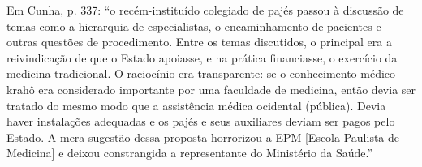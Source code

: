 Em Cunha, p. 337: \enquote{o recém-instituído colegiado de pajés passou à discussão de temas como a hierarquia de especialistas, o encaminhamento de pacientes e outras questões de procedimento. Entre os temas discutidos, o principal era a reivindicação de que o Estado apoiasse, e na prática financiasse, o exercício  da medicina tradicional. O raciocínio era transparente: se o conhecimento médico krahô era considerado importante por uma faculdade de medicina, então devia ser tratado do mesmo modo que a assistência médica ocidental (pública). Devia haver instalações adequadas e os pajés e seus auxiliares deviam ser pagos pelo Estado. A mera sugestão dessa proposta horrorizou a EPM [Escola Paulista de Medicina] e deixou constrangida a representante do Ministério da Saúde.}